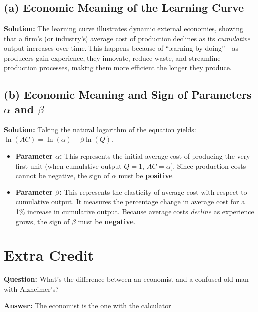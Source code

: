 \documentclass[11pt, letterpaper]{article}
\begin{document}
\subsection*{(a) Economic Meaning of the Learning Curve}
\noindent \textbf{Solution:}
The learning curve illustrates dynamic external economies, showing that a firm's (or industry's) average cost of production declines as its \textit{cumulative} output increases over time. This happens because of ``learning-by-doing''---as producers gain experience, they innovate, reduce waste, and streamline production processes, making them more efficient the longer they produce.

\subsection*{(b) Economic Meaning and Sign of Parameters $\alpha$ and $\beta$}
\noindent \textbf{Solution:}
Taking the natural logarithm of the equation yields: $\ln(AC) = \ln(\alpha) + \beta \ln(Q)$.
\begin{itemize}
  \item \textbf{Parameter $\alpha$:} This represents the initial average cost of producing the very first unit (when cumulative output $Q = 1$, $AC = \alpha$). Since production costs cannot be negative, the sign of $\alpha$ must be \textbf{positive}.
  \item \textbf{Parameter $\beta$:} This represents the elasticity of average cost with respect to cumulative output. It measures the percentage change in average cost for a 1\% increase in cumulative output. Because average costs \textit{decline} as experience grows, the sign of $\beta$ must be \textbf{negative}.
\end{itemize}

\vspace{1em}
\section*{Extra Credit}

\textbf{Question:} What's the difference between an economist and a confused old man with Alzheimer's?

\noindent \textbf{Answer:}
The economist is the one with the calculator.
\end{document}
